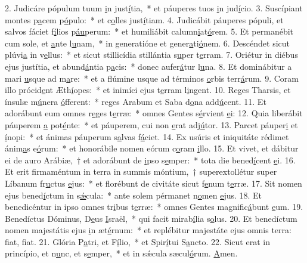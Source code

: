 2. Judicáre pópulum tuum \uline{i}n just\uline{í}tia,~* et páuperes tuos \uline{i}n jud\uline{í}cio.
3. Suscípiant montes p\uline{a}cem p\uline{ó}pulo:~* et c\uline{o}lles just\uline{í}tiam.
4. Judicábit páuperes pópuli, et salvos fáciet f\uline{í}lios p\uline{áu}perum:~* et humiliábit calumn\uline{i}at\uline{ó}rem.
5. Et permanébit cum sole, et \uline{a}nte l\uline{u}nam,~* in generatióne et gener\uline{a}ti\uline{ó}nem.
6. Descéndet sicut plúvi\uline{a} in v\uline{e}llus:~* et sicut stillicídia stillántia s\uline{u}per t\uline{e}rram.
7. Oriétur in diébus ejus justítia, et abund\uline{á}ntia p\uline{a}cis:~* donec aufer\uline{á}tur l\uline{u}na.
8. Et dominábitur a mari \uline{u}sque ad m\uline{a}re:~* et a flúmine usque ad términos \uline{o}rbis terr\uline{á}rum.
9. Coram illo prócid\uline{e}nt Æth\uline{í}opes:~* et inimíci ejus t\uline{e}rram l\uline{i}ngent.
10. Reges Tharsis, et ínsulæ m\uline{ú}nera \uline{ó}fferent:~* reges Arabum et Saba d\uline{o}na add\uline{ú}cent.
11. Et adorábunt eum omnes r\uline{e}ges t\uline{e}rræ:~* omnes Gentes s\uline{é}rvient \uline{e}i:
12. Quia liberábit páuperem \uline{a} pot\uline{é}nte:~* et páuperem, cui non \uline{e}rat adj\uline{ú}tor.
13. Parcet páuper\uline{i} et \uline{í}nopi:~* et ánimas páuperum s\uline{a}lvas f\uline{á}ciet.
14. Ex usúris et iniquitáte rédimet ánim\uline{a}s e\uline{ó}rum:~* et honorábile nomen eórum c\uline{o}ram \uline{i}llo.
15. Et vivet, et dábitur ei de auro Arábiæ,~† et adorábunt de \uline{i}pso s\uline{e}mper:~* tota die bened\uline{í}cent \uline{e}i.
16. Et erit firmaméntum in terra in summis móntium,~† superextollétur super Líbanum fr\uline{u}ctus \uline{e}jus:~* et florébunt de civitáte sicut f\uline{e}num t\uline{e}rræ.
17. Sit nomen ejus bened\uline{í}ctum in s\uline{ǽ}cula:~* ante solem pérmanet n\uline{o}men \uline{e}jus.
18. Et benedicéntur in ipso omnes tr\uline{i}bus t\uline{e}rræ:~* omnes Gentes magnific\uline{á}bunt \uline{e}um.
19. Benedíctus Dóminus, D\uline{e}us \uline{I}sraël,~* qui facit mirab\uline{í}lia s\uline{o}lus.
20. Et benedíctum nomen majestátis ejus \uline{i}n æt\uline{é}rnum:~* et replébitur majestáte ejus omnis terra: f\uline{i}at, f\uline{i}at.
21. Glória P\uline{a}tri, et F\uline{í}lio,~* et Spir\uline{í}tui S\uline{a}ncto.
22. Sicut erat in princípio, et n\uline{u}nc, et s\uline{e}mper,~* et in sǽcula sæcul\uline{ó}rum. \uline{A}men.

